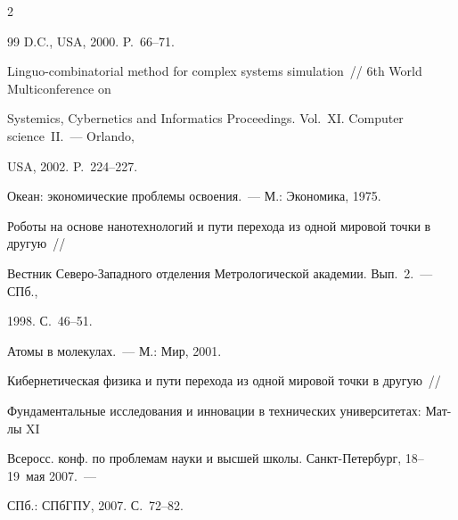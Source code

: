 \begin{multicols}{2}
{{\begin{thebibliography}{99}
D.C., USA, 2000. P.~66--71.









Linguo-combinatorial method for complex systems simulation~// 6th World Multiconference on 


Systemics, Cybernetics and Informatics Proceedings. Vol.~XI. Computer science~II.~--- Orlando, 


USA, 2002. P.~224--227. 









Океан: экономические проблемы освоения.~--- М.: Экономика, 1975.









Роботы на основе нанотехнологий и пути перехода из одной мировой точки в другую~// 


Вестник Се\-ве\-ро-За\-пад\-но\-го отделения Метрологической академии. Вып.~2.~--- СПб., 


1998. С.~46--51.









Атомы в молекулах.~--- М.: Мир, 2001.









Кибернетическая физика и пути перехода из одной мировой точки в другую~// 


Фундаментальные исследования и инновации в технических университетах: Мат-лы XI 


Всеросс. конф. по проблемам науки и высшей школы. Санкт-Петербург, 18--19~мая 2007.~--- 


СПб.: СПбГПУ, 2007. С.~72--82.










\end{thebibliography}}}
\end{multicols}
